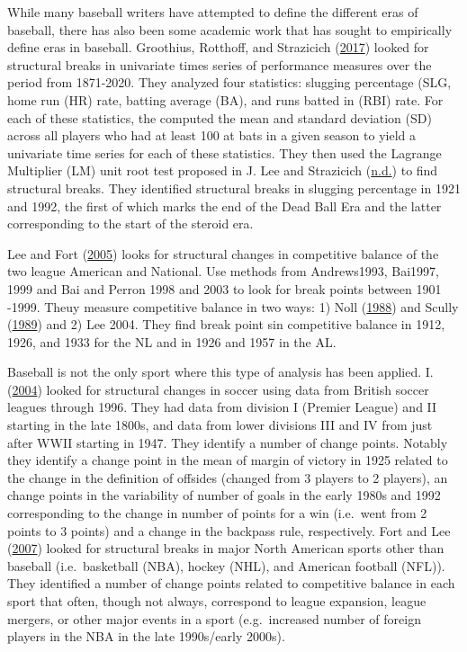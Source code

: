 \documentclass[
  12pt,
]{article}
\begin{document}
While many baseball writers have attempted to define the different eras
of baseball, there has also been some academic work that has sought to
empirically define eras in baseball. Groothius, Rotthoff, and Strazicich
(\protect\hyperlink{ref-Groothius2017}{2017}) looked for structural
breaks in univariate times series of performance measures over the
period from 1871-2020. They analyzed four statistics: slugging
percentage (SLG, home run (HR) rate, batting average (BA), and runs
batted in (RBI) rate. For each of these statistics, the computed the
mean and standard deviation (SD) across all players who had at least 100
at bats in a given season to yield a univariate time series for each of
these statistics. They then used the Lagrange Multiplier (LM) unit root
test proposed in J. Lee and Strazicich
(\protect\hyperlink{ref-LeeandStrazicich2003}{n.d.}) to find structural
breaks. They identified structural breaks in slugging percentage in 1921
and 1992, the first of which marks the end of the Dead Ball Era and the
latter corresponding to the start of the steroid era.

Lee and Fort (\protect\hyperlink{ref-LeeFort2005}{2005}) looks for
structural changes in competitive balance of the two league American and
National. Use methods from Andrews1993, Bai1997, 1999 and Bai and Perron
1998 and 2003 to look for break points between 1901 -1999. Theuy measure
competitive balance in two ways: 1) Noll
(\protect\hyperlink{ref-Noll1988}{1988}) and Scully
(\protect\hyperlink{ref-Scully1989}{1989}) and 2) Lee 2004. They find
break point sin competitive balance in 1912, 1926, and 1933 for the NL
and in 1926 and 1957 in the AL.

Baseball is not the only sport where this type of analysis has been
applied. I. (\protect\hyperlink{ref-PalaciosHuerta2004}{2004}) looked
for structural changes in soccer using data from British soccer leagues
through 1996. They had data from division I (Premier League) and II
starting in the late 1800s, and data from lower divisions III and IV
from just after WWII starting in 1947. They identify a number of change
points. Notably they identify a change point in the mean of margin of
victory in 1925 related to the change in the definition of offsides
(changed from 3 players to 2 players), an change points in the
variability of number of goals in the early 1980s and 1992 corresponding
to the change in number of points for a win (i.e.~went from 2 points to
3 points) and a change in the backpass rule, respectively. Fort and Lee
(\protect\hyperlink{ref-FortLee2007}{2007}) looked for structural breaks
in major North American sports other than baseball (i.e.~basketball
(NBA), hockey (NHL), and American football (NFL)). They identified a
number of change points related to competitive balance in each sport
that often, though not always, correspond to league expansion, league
mergers, or other major events in a sport (e.g.~increased number of
foreign players in the NBA in the late 1990s/early 2000s).
\end{document}
